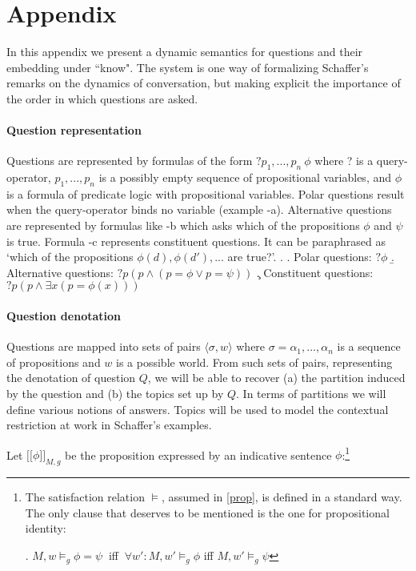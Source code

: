 \newcommand{\lin}{\ensuremath{\lbrack\!\lbrack}}
\newcommand{\rin}{\ensuremath{\rbrack\!\rbrack}}



\section*{Appendix}


 In this appendix we present a dynamic semantics for questions and
their embedding under ``know". The system is one way of
formalizing Schaffer's remarks on the dynamics of conversation,
but making explicit the importance of the order in which questions
are
asked.

\paragraph{Question representation} 

Questions are represented  by   formulas of the form $?  p_1, ..., p_n \ \phi$ where ? is a query-operator, $p_1, ..., p_n$ is a possibly empty sequence of propositional variables, and $\phi$ is a formula of   predicate logic with   propositional variables.   Polar questions result when the query-operator binds no variable  (example \Next-a). Alternative questions are represented by   formulas like \Next-b which asks which of the propositions $\phi$ and $\psi$ is true. Formula \Next-c represents constituent questions.  It can be paraphrased as `which of the propositions   $ \phi(d),   \phi(d'),... $ are true?'.
\ex.
\a. Polar questions: $?  \phi$
\b. Alternative questions: $?p ( p \wedge   (p=\phi \vee p=\psi)    )$
\c. Constituent questions: $?p (p \wedge  \exists x (p=\phi(x)) )$


\paragraph{Question denotation}
Questions are mapped into sets of   pairs   $\langle \sigma,w\rangle$ where $\sigma=\alpha_1,...,\alpha_n$ is a   sequence of propositions and $w$ is a possible world. From such sets of pairs, representing the denotation of question $Q$, we will be able to recover (a) the partition induced by the question  and (b) the topics  set up by $Q$. In terms of partitions we will define various notions of answers. Topics will be used to model the contextual restriction  at work in Schaffer's examples.


Let $\lin \phi\rin_{M,g}$ be the  proposition expressed by an indicative sentence $\phi$:\footnote{The satisfaction relation $\models$, assumed in \ref{prop},  is defined in a standard way. The only clause that deserves to be   mentioned is the one for propositional identity:
 
 \ex. $M,w   \models_g  \phi=\psi \ $ iff $ \ \forall w': M,w'   \models_g  \phi $ iff $M,w'   \models_g \psi$ 

}

